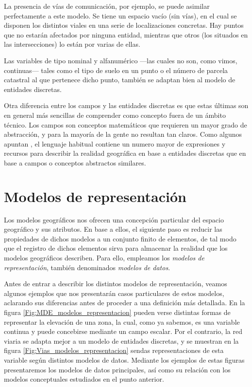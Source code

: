 \begin{multicols}{2}
La presencia de vías de comunicación, por ejemplo, se puede asimilar perfectamente a este modelo. Se tiene un espacio vacío (sin vías), en el cual se disponen los distintos viales en una serie de localizaciones concretas. Hay puntos que no estarán afectados por ninguna entidad, mientras que otros (los situados en las intersecciones) lo están por varias de ellas.

Las variables de tipo nominal y alfanumérico ---las cuales no son, como vimos, continuas--- tales como el tipo de suelo en un punto o el número de parcela catastral al que pertenece dicho punto, también se adaptan bien al modelo de entidades discretas.

Otra diferencia entre los campos y las entidades discretas es que estas últimas son en general más sencillas de comprender como concepto fuera de un ámbito técnico. Los campos son conceptos matemáticos que requieren un mayor grado de abstracción, y para la mayoría de la gente no resultan tan claros. Como algunos apuntan \cite{NCGIA}, el lenguaje habitual contiene un numero mayor de expresiones y recursos para describir la realidad geográfica en base a entidades discretas que en base a campos o conceptos abstractos similares.

\section{Modelos de representación}

Los modelos geográficos nos ofrecen una concepción particular del espacio geográfico y sus atributos. En base a ellos, el siguiente paso es reducir las propiedades de dichos modelos a un conjunto finito de elementos, de tal modo que el registro de dichos elementos sirva para almacenar la realidad que los modelos geográficos describen. Para ello, empleamos los \emph{modelos de representación}, también denominados \emph{modelos de datos}.


Antes de entrar a describir los distintos modelos de representación, veamos algunos ejemplos que nos presentarán casos particulares de estos modelos, aclarando sus diferencias antes de proceder a una definición más detallada. En la figura \ref{Fig:MDE_modelos_representacion} pueden verse distintas formas de representar la elevación de una zona, la cual, como ya sabemos, es una variable continua y puede concebirse mediante un campo escalar. Por el contrario, la red viaria se adapta mejor a un modelo de entidades discretas, y se muestran en la figura \ref{Fig:Vias_modelos_representacion} sendas representaciones de esta variable según distintos modelos de datos. Mediante los ejemplos de estas figuras presentaremos los modelos de datos principales, así como su relación con los modelos conceptuales estudiados en el punto anterior.


\end{multicols}
